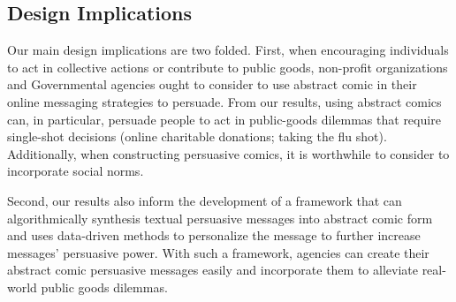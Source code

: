 \subsection{Design Implications}
Our main design implications are two folded. First, when encouraging individuals to act in collective actions or contribute to public goods, non-profit organizations and Governmental agencies ought to consider to use abstract comic in their online messaging strategies to persuade. From our results, using abstract comics can, in particular, persuade people to act in public-goods dilemmas that require single-shot decisions (online charitable donations; taking the flu shot). Additionally, when constructing persuasive comics, it is worthwhile to consider to incorporate social norms.  

Second, our results also inform the development of a framework that can algorithmically synthesis textual persuasive messages into abstract comic form and uses data-driven methods to personalize the message to further increase messages' persuasive power. With such a framework, agencies can create their abstract comic persuasive messages easily and incorporate them to alleviate real-world public goods dilemmas. 

